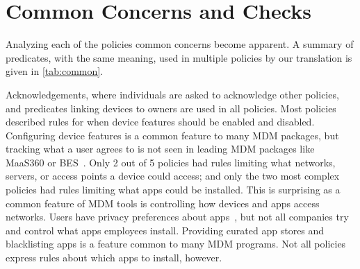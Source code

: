 \documentclass[conference,twocolumn]{IEEEtran}
\begin{document}
\section{Common Concerns and Checks}
\label{sec:common_concerns}

Analyzing each of the policies common concerns become apparent.
A summary of predicates, with the same meaning, used in multiple policies by our translation is given in \autoref{tab:common}.


Acknowledgements, where individuals are asked to acknowledge other policies, and predicates linking devices to owners are used in all policies.
Most policies described rules for when device features should be enabled and disabled.
Configuring device features is a common feature to many MDM packages, but tracking what a user agrees to is not seen in leading MDM packages like MaaS360 or BES~\cite{rob_smith_magic_2016}.
Only 2 out of 5 policies had rules limiting what networks, servers, or access points a device could access;
  and only the two most complex policies had rules limiting what apps could be installed.
This is surprising as a common feature of MDM tools is controlling how devices and apps access networks.
Users have privacy preferences about apps~\cite{lin_modeling_2014}, but not all companies try and control what apps employees install.
Providing curated app stores and blacklisting apps is a feature common to many MDM programs.
Not all policies express rules about which apps to install, however.
\end{document}
